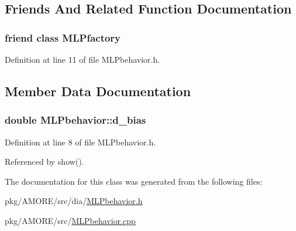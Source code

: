 \subsection{Friends And Related Function Documentation}
\hypertarget{class_m_l_pbehavior_a1aa48940238b9487734e590ffab33a1b}{
\subsubsection[{MLPfactory}]{\setlength{\rightskip}{0pt plus 5cm}friend class {\bf MLPfactory}}}
\label{class_m_l_pbehavior_a1aa48940238b9487734e590ffab33a1b}


Definition at line 11 of file MLPbehavior.h.



\subsection{Member Data Documentation}
\hypertarget{class_m_l_pbehavior_a6206785c5c3f838a0538f9f77fa7a25a}{
\subsubsection[{d\_\-bias}]{\setlength{\rightskip}{0pt plus 5cm}double {\bf MLPbehavior::d\_\-bias}}}
\label{class_m_l_pbehavior_a6206785c5c3f838a0538f9f77fa7a25a}


Definition at line 8 of file MLPbehavior.h.



Referenced by show().



The documentation for this class was generated from the following files:\begin{DoxyCompactItemize}
\item 
pkg/AMORE/src/dia/\hyperlink{_m_l_pbehavior_8h}{MLPbehavior.h}\item 
pkg/AMORE/src/\hyperlink{_m_l_pbehavior_8cpp}{MLPbehavior.cpp}\end{DoxyCompactItemize}

